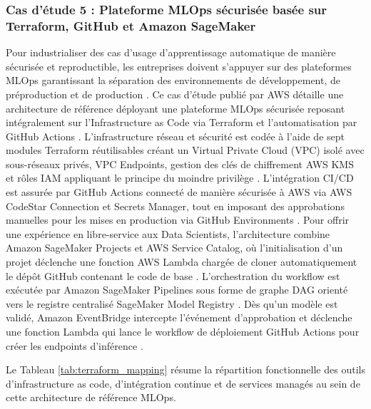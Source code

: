\subsubsection{Cas d'étude 5 : Plateforme MLOps sécurisée basée sur Terraform, GitHub et Amazon SageMaker}
Pour industrialiser des cas d'usage d'apprentissage automatique de manière sécurisée et reproductible, les entreprises doivent s'appuyer sur des plateformes MLOps garantissant la séparation des environnements de développement, de préproduction et de production \cite{83}. Ce cas d'étude publié par AWS détaille une architecture de référence déployant une plateforme MLOps sécurisée reposant intégralement sur l'Infrastructure as Code via Terraform et l'automatisation par GitHub Actions \cite{83}. L'infrastructure réseau et sécurité est codée à l'aide de sept modules Terraform réutilisables créant un Virtual Private Cloud (VPC) isolé avec sous-réseaux privés, VPC Endpoints, gestion des clés de chiffrement AWS KMS et rôles IAM appliquant le principe du moindre privilège \cite{83}. L'intégration CI/CD est assurée par GitHub Actions connecté de manière sécurisée à AWS via AWS CodeStar Connection et Secrets Manager, tout en imposant des approbations manuelles pour les mises en production via GitHub Environments \cite{79, 83}. Pour offrir une expérience en libre-service aux Data Scientists, l'architecture combine Amazon SageMaker Projects et AWS Service Catalog, où l'initialisation d'un projet déclenche une fonction AWS Lambda chargée de cloner automatiquement le dépôt GitHub contenant le code de base \cite{79, 83}. L'orchestration du workflow est exécutée par Amazon SageMaker Pipelines sous forme de graphe DAG orienté vers le registre centralisé SageMaker Model Registry \cite{79, 83}. Dès qu'un modèle est validé, Amazon EventBridge intercepte l'événement d'approbation et déclenche une fonction Lambda qui lance le workflow de déploiement GitHub Actions pour créer les endpoints d'inférence \cite{79}.

Le Tableau \ref{tab:terraform_mapping} résume la répartition fonctionnelle des outils d'infrastructure as code, d'intégration continue et de services managés au sein de cette architecture de référence MLOps.

